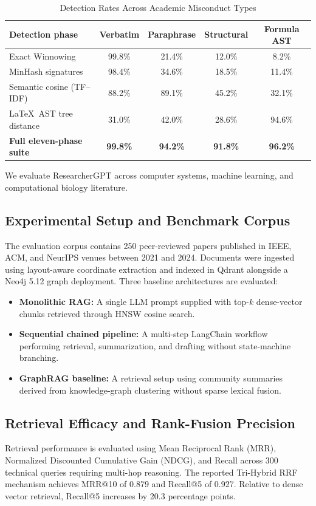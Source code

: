 \documentclass[conference]{IEEEtran}
\begin{document}
\begin{table}[!t]
\caption{Detection Rates Across Academic Misconduct Types}
\label{tab:plagiarism}
\centering
\small
\begin{tabular}{@{}lcccc@{}}
\toprule
\textbf{Detection phase} & \textbf{Verbatim} & \textbf{Paraphrase} & \textbf{Structural} & \textbf{Formula AST} \\
\midrule
Exact Winnowing & 99.8\% & 21.4\% & 12.0\% & 8.2\% \\
MinHash signatures & 98.4\% & 34.6\% & 18.5\% & 11.4\% \\
Semantic cosine (TF--IDF) & 88.2\% & 89.1\% & 45.2\% & 32.1\% \\
\LaTeX\ AST tree distance & 31.0\% & 42.0\% & 28.6\% & 94.6\% \\
\textbf{Full eleven-phase suite} & \textbf{99.8\%} & \textbf{94.2\%} & \textbf{91.8\%} & \textbf{96.2\%} \\
\bottomrule
\end{tabular}
\end{table}

We evaluate ResearcherGPT across computer systems, machine learning, and computational biology literature.

\subsection{Experimental Setup and Benchmark Corpus}
The evaluation corpus contains 250 peer-reviewed papers published in IEEE, ACM, and NeurIPS venues between 2021 and 2024. Documents were ingested using layout-aware coordinate extraction and indexed in Qdrant alongside a Neo4j 5.12 graph deployment. Three baseline architectures are evaluated:
\begin{itemize}
\item \textbf{Monolithic RAG:} A single LLM prompt supplied with top-$k$ dense-vector chunks retrieved through HNSW cosine search.
\item \textbf{Sequential chained pipeline:} A multi-step LangChain workflow performing retrieval, summarization, and drafting without state-machine branching.
\item \textbf{GraphRAG baseline:} A retrieval setup using community summaries derived from knowledge-graph clustering without sparse lexical fusion.
\end{itemize}

\subsection{Retrieval Efficacy and Rank-Fusion Precision}
Retrieval performance is evaluated using Mean Reciprocal Rank (MRR), Normalized Discounted Cumulative Gain (NDCG), and Recall across 300 technical queries requiring multi-hop reasoning. The reported Tri-Hybrid RRF mechanism achieves MRR@10 of 0.879 and Recall@5 of 0.927. Relative to dense vector retrieval, Recall@5 increases by 20.3 percentage points.
\end{document}
